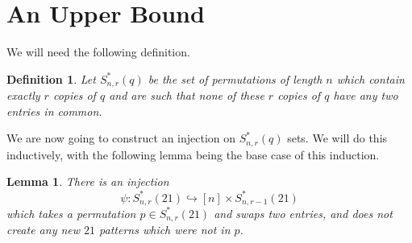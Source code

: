 \documentclass[11pt, final]{amsart}
\newtheorem{lemma}[theorem]{Lemma}
\newtheorem{definition}[theorem]{Definition}
\theoremstyle{remark}
\numberwithin{equation}{section}
\begin{document}

    


\section{An Upper Bound}
We will need the following definition.
\begin{definition}
    Let $S^*_{n,r}(q)$ be the set of permutations of length $n$ which contain exactly $r$ copies of $q$ and are such that none of these $r$ copies of $q$ have any two entries in common.
\end{definition}
We are now going to construct an injection on $S^*_{n,r}(q)$ sets. We will do this inductively, with the following lemma being the base case of this induction.
\begin{lemma}
    There is an injection 
    \[
    \psi: S_{n,r}^*(21) \hookrightarrow [n] \times S^*_{n,r-1}(21)
    \]
    which takes a permutation $p \in S_{n,r}^*(21)$ and swaps two entries, and does not create any new $21$ patterns which were not in $p$.
\end{lemma}
\end{document}
